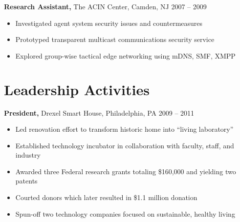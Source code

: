 \documentclass[margin]{res}
\begin{document}
\begin{resume}
 {\bf Research Assistant,} The ACIN Center, Camden, NJ \hfill 2007 -- 2009
 \begin{itemize} \itemsep -2pt  %
 \item Investigated agent system security issues and countermeasures 
 \item Prototyped transparent multicast communications security service 
\item Explored group-wise tactical edge networking using mDNS, SMF, XMPP 
 \end{itemize}


\section{Leadership  Activities} 
     {\bf President,} Drexel Smart House, Philadelphia, PA \hfill 2009 -- 2011 %
     \begin{itemize} \itemsep -2pt
     \item Led renovation effort to transform historic home into ``living laboratory''
     \item Established technology incubator in collaboration with faculty, staff, and industry
     \item Awarded three Federal research grants totaling \$160,000 and yielding two patents
     \item Courted donors which later resulted in \$1.1 million donation
     \item Spun-off two technology companies focused on sustainable, healthy living
     \end{itemize}


\end{resume}
\end{document}
